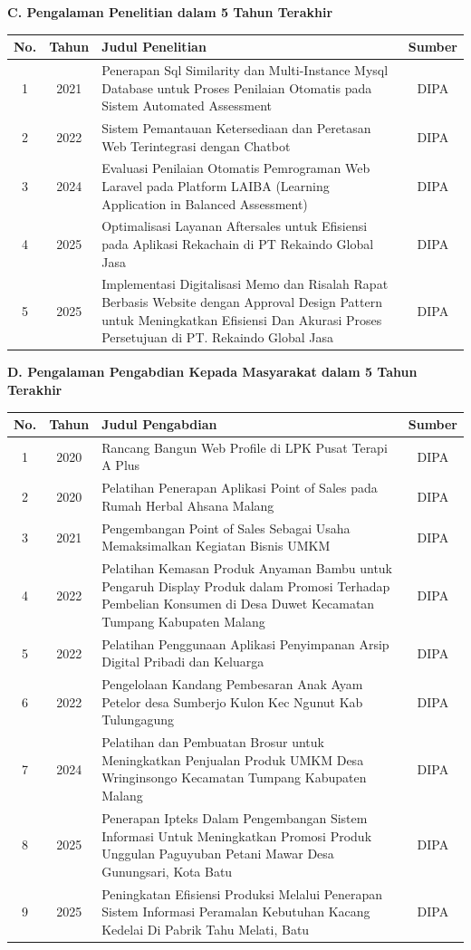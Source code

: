 \textbf{C. Pengalaman Penelitian dalam 5 Tahun Terakhir}

{\footnotesize
\begin{longtable}{|c|c|p{7cm}|c|}
\hline
\textbf{No.} & \textbf{Tahun} & \textbf{Judul Penelitian} & \textbf{Sumber} \\
\hline
1 & 2021 & Penerapan Sql Similarity dan Multi-Instance Mysql Database untuk Proses Penilaian Otomatis pada Sistem Automated Assessment & DIPA \\
\hline
2 & 2022 & Sistem Pemantauan Ketersediaan dan Peretasan Web Terintegrasi dengan Chatbot & DIPA \\
\hline
3 & 2024 & Evaluasi Penilaian Otomatis Pemrograman Web Laravel pada Platform LAIBA (Learning Application in Balanced Assessment) & DIPA \\
\hline
4 & 2025 & Optimalisasi Layanan Aftersales untuk Efisiensi pada Aplikasi Rekachain di PT Rekaindo Global Jasa & DIPA \\
\hline
5 & 2025 & Implementasi Digitalisasi Memo dan Risalah Rapat Berbasis Website dengan Approval Design Pattern untuk Meningkatkan Efisiensi Dan Akurasi Proses Persetujuan di PT. Rekaindo Global Jasa & DIPA \\
\hline
\end{longtable}
}

\textbf{D. Pengalaman Pengabdian Kepada Masyarakat dalam 5 Tahun Terakhir}

{\footnotesize
\begin{longtable}{|c|c|p{7cm}|c|}
\hline
\textbf{No.} & \textbf{Tahun} & \textbf{Judul Pengabdian} & \textbf{Sumber} \\
\hline
1 & 2020 & Rancang Bangun Web Profile di LPK Pusat Terapi A Plus & DIPA \\
\hline
2 & 2020 & Pelatihan Penerapan Aplikasi Point of Sales pada Rumah Herbal Ahsana Malang & DIPA \\
\hline
3 & 2021 & Pengembangan Point of Sales Sebagai Usaha Memaksimalkan Kegiatan Bisnis UMKM & DIPA \\
\hline
4 & 2022 & Pelatihan Kemasan Produk Anyaman Bambu untuk Pengaruh Display Produk dalam Promosi Terhadap Pembelian Konsumen di Desa Duwet Kecamatan Tumpang Kabupaten Malang & DIPA \\
\hline
5 & 2022 & Pelatihan Penggunaan Aplikasi Penyimpanan Arsip Digital Pribadi dan Keluarga & DIPA \\
\hline
6 & 2022 & Pengelolaan Kandang Pembesaran Anak Ayam Petelor desa Sumberjo Kulon Kec Ngunut Kab Tulungagung & DIPA \\
\hline
7 & 2024 & Pelatihan dan Pembuatan Brosur untuk Meningkatkan Penjualan Produk UMKM Desa Wringinsongo Kecamatan Tumpang Kabupaten Malang & DIPA \\
\hline
8 & 2025 & Penerapan Ipteks Dalam Pengembangan Sistem Informasi Untuk Meningkatkan Promosi Produk Unggulan Paguyuban Petani Mawar Desa Gunungsari, Kota Batu & DIPA \\
\hline
9 & 2025 & Peningkatan Efisiensi Produksi Melalui Penerapan Sistem Informasi Peramalan Kebutuhan Kacang Kedelai Di Pabrik Tahu Melati, Batu & DIPA \\
\hline
\end{longtable}
}

